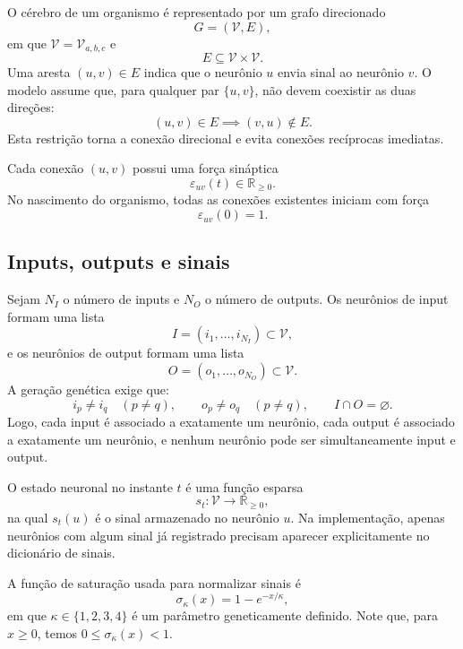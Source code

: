 \documentclass[12pt,a4paper,fleqn]{article}
\newcommand{\R}{\mathbb{R}}
\begin{document}
O cérebro de um organismo é representado por um grafo direcionado
$$
	G = (\mathcal{V},E),
$$
em que $\mathcal{V}=\mathcal{V}_{a,b,c}$ e
$$
	E \subseteq \mathcal{V}\times\mathcal{V}.
$$
Uma aresta $(u,v)\in E$ indica que o neurônio $u$ envia sinal ao neurônio $v$. O modelo assume que, para qualquer par $\{u,v\}$, não devem coexistir as duas direções:
$$
	(u,v)\in E \implies (v,u)\notin E.
$$
Esta restrição torna a conexão direcional e evita conexões recíprocas imediatas.

Cada conexão $(u,v)$ possui uma força sináptica
$$
	\varepsilon_{uv}(t) \in \R_{\geq 0}.
$$
No nascimento do organismo, todas as conexões existentes iniciam com força
$$
	\varepsilon_{uv}(0)=1.
$$

\subsection{Inputs, outputs e sinais}

Sejam $N_I$ o número de inputs e $N_O$ o número de outputs. Os neurônios de input formam uma lista
$$
	I=(i_1,\ldots,i_{N_I}) \subset \mathcal{V},
$$
e os neurônios de output formam uma lista
$$
	O=(o_1,\ldots,o_{N_O}) \subset \mathcal{V}.
$$
A geração genética exige que:
$$
	i_p \neq i_q\quad(p\neq q),\qquad
	o_p \neq o_q\quad(p\neq q),\qquad
	I\cap O=\varnothing.
$$
Logo, cada input é associado a exatamente um neurônio, cada output é associado a exatamente um neurônio, e nenhum neurônio pode ser simultaneamente input e output.

O estado neuronal no instante $t$ é uma função esparsa
$$
	s_t:\mathcal{V}\to \R_{\geq 0},
$$
na qual $s_t(u)$ é o sinal armazenado no neurônio $u$. Na implementação, apenas neurônios com algum sinal já registrado precisam aparecer explicitamente no dicionário de sinais.

A função de saturação usada para normalizar sinais é
$$
	\sigma_\kappa(x)=1-e^{-x/\kappa},
$$
em que $\kappa\in\{1,2,3,4\}$ é um parâmetro geneticamente definido. Note que, para $x\geq0$, temos $0\leq \sigma_\kappa(x)<1$.
\end{document}
